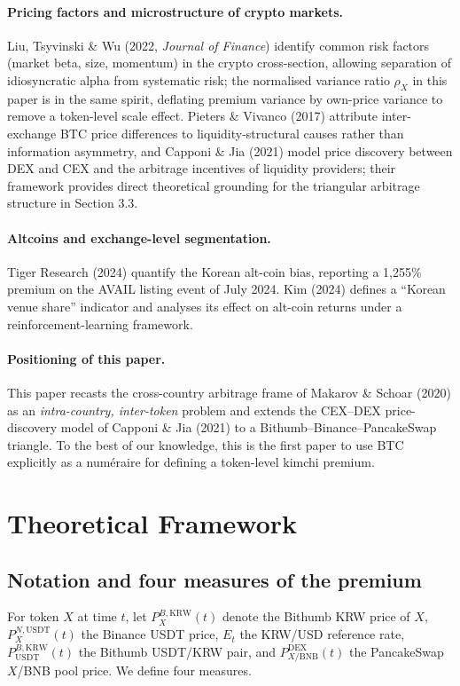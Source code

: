 \documentclass[11pt,a4paper]{article}
\begin{document}
\paragraph{Pricing factors and microstructure of crypto markets.}
Liu, Tsyvinski \& Wu (2022, \emph{Journal of Finance}) identify common risk factors (market beta,
size, momentum) in the crypto cross-section, allowing separation of idiosyncratic alpha from
systematic risk; the normalised variance ratio $\rho_X$ in this paper is in the same spirit, deflating
premium variance by own-price variance to remove a token-level scale effect. Pieters \& Vivanco
(2017) attribute inter-exchange BTC price differences to liquidity-structural causes rather than
information asymmetry, and Capponi \& Jia (2021) model price discovery between DEX and CEX and the
arbitrage incentives of liquidity providers; their framework provides direct theoretical grounding
for the triangular arbitrage structure in Section 3.3.

\paragraph{Altcoins and exchange-level segmentation.}
Tiger Research (2024) quantify the Korean alt-coin bias, reporting a 1{,}255\% premium on the
AVAIL listing event of July 2024. Kim (2024) defines a ``Korean venue share'' indicator and analyses
its effect on alt-coin returns under a reinforcement-learning framework.

\paragraph{Positioning of this paper.}
This paper recasts the cross-country arbitrage frame of Makarov \& Schoar (2020) as an
\emph{intra-country, inter-token} problem and extends the CEX--DEX price-discovery model of
Capponi \& Jia (2021) to a Bithumb--Binance--PancakeSwap triangle. To the best of our knowledge,
this is the first paper to use BTC explicitly as a num\'eraire for defining a token-level kimchi
premium.

\section{Theoretical Framework}

\subsection{Notation and four measures of the premium}
For token $X$ at time $t$, let
$P_X^{B,\text{KRW}}(t)$ denote the Bithumb KRW price of $X$,
$P_X^{N,\text{USDT}}(t)$ the Binance USDT price,
$E_t$ the KRW/USD reference rate,
$P_{\text{USDT}}^{B,\text{KRW}}(t)$ the Bithumb USDT/KRW pair,
and $P_{X/\text{BNB}}^{\text{DEX}}(t)$ the PancakeSwap $X$/BNB pool price. We define four measures.
\end{document}
